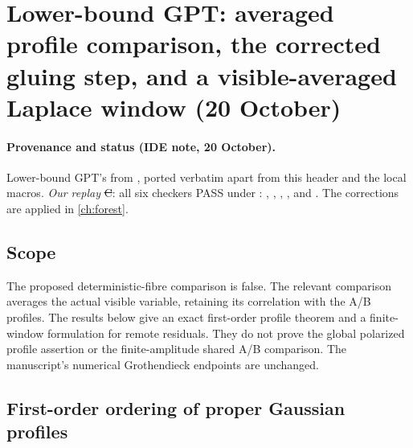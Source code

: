 \section{Lower-bound GPT: averaged profile comparison, the corrected gluing step, and a visible-averaged Laplace window (20 October)}\label{ch:gpt-averaged}

\paragraph{Provenance and status (IDE note, 20 October).} Lower-bound GPT's  from , ported verbatim apart
from this header and the local macros. \emph{Our replay} \st{C}: all six checkers PASS under : , ,
, ,  and . The corrections are applied in
\autoref{ch:forest}.
\providecommand{\EE}{\mathbb E}\providecommand{\CC}{\mathbb C}\providecommand{\eps}{\varepsilon}\providecommand{\HH}{\mathcal H}\providecommand{\Var}{\operatorname{Var}}

\subsection{Scope}
The proposed deterministic-fibre comparison is false. The relevant
comparison averages the actual visible variable, retaining its
correlation with the A/B profiles. The results below give an exact
first-order profile theorem and a finite-window formulation for remote
residuals. They do not prove the global polarized profile assertion or
the finite-amplitude shared A/B comparison. The manuscript's numerical
Grothendieck endpoints are unchanged.

\subsection{First-order ordering of proper Gaussian profiles}
\label{avg:firstorder}

